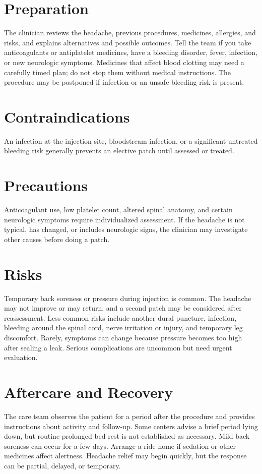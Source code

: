 \section*{Preparation}
The clinician reviews the headache, previous procedures, medicines, allergies, and risks, and explains alternatives and possible outcomes. Tell the team if you take anticoagulants or antiplatelet medicines, have a bleeding disorder, fever, infection, or new neurologic symptoms. Medicines that affect blood clotting may need a carefully timed plan; do not stop them without medical instructions. The procedure may be postponed if infection or an unsafe bleeding risk is present.

\section*{Contraindications}
An infection at the injection site, bloodstream infection, or a significant untreated bleeding risk generally prevents an elective patch until assessed or treated.

\section*{Precautions}
Anticoagulant use, low platelet count, altered spinal anatomy, and certain neurologic symptoms require individualized assessment. If the headache is not typical, has changed, or includes neurologic signs, the clinician may investigate other causes before doing a patch.

\section*{Risks}
Temporary back soreness or pressure during injection is common. The headache may not improve or may return, and a second patch may be considered after reassessment. Less common risks include another dural puncture, infection, bleeding around the spinal cord, nerve irritation or injury, and temporary leg discomfort. Rarely, symptoms can change because pressure becomes too high after sealing a leak. Serious complications are uncommon but need urgent evaluation.

\section*{Aftercare and Recovery}
The care team observes the patient for a period after the procedure and provides instructions about activity and follow-up. Some centers advise a brief period lying down, but routine prolonged bed rest is not established as necessary. Mild back soreness can occur for a few days. Arrange a ride home if sedation or other medicines affect alertness. Headache relief may begin quickly, but the response can be partial, delayed, or temporary.

